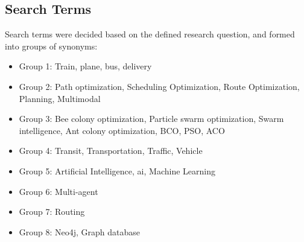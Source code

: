 \subsection{Search Terms}
\label{sec:searchTerms}
Search terms were decided based on the defined research question, and formed into groups of synonyms:
\begin{itemize}
\item Group 1: Train, plane, bus, delivery
\item Group 2: Path optimization, Scheduling Optimization, Route Optimization, Planning, Multimodal
\item Group 3: Bee colony optimization, Particle swarm optimization, Swarm intelligence, Ant colony optimization, BCO, PSO, ACO
\item Group 4: Transit, Transportation, Traffic, Vehicle
\item Group 5: Artificial Intelligence, ai, Machine Learning
\item Group 6: Multi-agent
\item Group 7: Routing
\item Group 8: Neo4j, Graph database
\end{itemize}


